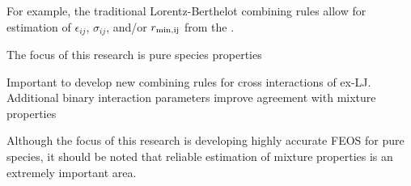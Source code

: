 \documentclass[11pt,a4paper]{article}
\begin{document}
For example, the traditional Lorentz-Berthelot combining rules allow for estimation of $\epsilon_{ij}$, $\sigma_{ij}$, and/or $r_{\rm min,ij}$ from the . 

The focus of this research is pure species properties 

Important to develop new combining rules for cross interactions of ex-LJ. Additional binary interaction parameters improve agreement with mixture properties

Although the focus of this research is developing highly accurate FEOS for pure species, it should be noted that reliable estimation of mixture properties is an extremely important area.





\end{document}
